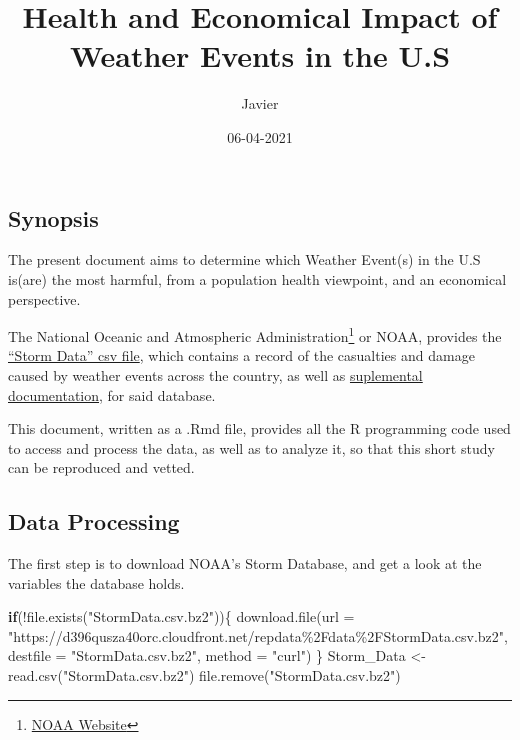 \documentclass[
]{article}
\title{Health and Economical Impact of Weather Events in the U.S}
\author{Javier}
\date{06-04-2021}
\newenvironment{Shaded}{\begin{snugshade}}{\end{snugshade}}
\newcommand{\AttributeTok}[1]{\textcolor[rgb]{0.77,0.63,0.00}{#1}}
\newcommand{\ControlFlowTok}[1]{\textcolor[rgb]{0.13,0.29,0.53}{\textbf{#1}}}
\newcommand{\FunctionTok}[1]{\textcolor[rgb]{0.00,0.00,0.00}{#1}}
\newcommand{\NormalTok}[1]{#1}
\newcommand{\OtherTok}[1]{\textcolor[rgb]{0.56,0.35,0.01}{#1}}
\newcommand{\SpecialCharTok}[1]{\textcolor[rgb]{0.00,0.00,0.00}{#1}}
\newcommand{\StringTok}[1]{\textcolor[rgb]{0.31,0.60,0.02}{#1}}
\begin{document}
\maketitle

\hypertarget{synopsis}{%
\subsection{Synopsis}\label{synopsis}}

The present document aims to determine which Weather Event(s) in the U.S
is(are) the most harmful, from a population health viewpoint, and an
economical perspective.

The National Oceanic and Atmospheric Administration\footnote{\href{https://www.noaa.gov/}{NOAA
  Website}} or NOAA, provides the
\href{https://d396qusza40orc.cloudfront.net/repdata\%2Fdata\%2FStormData.csv.bz2}{``Storm
Data'' csv file}, which contains a record of the casualties and damage
caused by weather events across the country, as well as
\href{https://d396qusza40orc.cloudfront.net/repdata\%2Fpeer2_doc\%2Fpd01016005curr.pdf}{suplemental
documentation}, for said database.

This document, written as a .Rmd file, provides all the R programming
code used to access and process the data, as well as to analyze it, so
that this short study can be reproduced and vetted.

\hypertarget{data-processing}{%
\subsection{Data Processing}\label{data-processing}}

The first step is to download NOAA's Storm Database, and get a look at
the variables the database holds.

\begin{Shaded}
\begin{Highlighting}[]
\ControlFlowTok{if}\NormalTok{(}\SpecialCharTok{!}\FunctionTok{file.exists}\NormalTok{(}\StringTok{"StormData.csv.bz2"}\NormalTok{))\{}
  \FunctionTok{download.file}\NormalTok{(}\AttributeTok{url =} \StringTok{"https://d396qusza40orc.cloudfront.net/repdata\%2Fdata\%2FStormData.csv.bz2"}\NormalTok{,}
              \AttributeTok{destfile =} \StringTok{"StormData.csv.bz2"}\NormalTok{,}
              \AttributeTok{method =} \StringTok{"curl"}\NormalTok{)}
\NormalTok{  \}}
\NormalTok{Storm\_Data }\OtherTok{\textless{}{-}} \FunctionTok{read.csv}\NormalTok{(}\StringTok{"StormData.csv.bz2"}\NormalTok{)}
\FunctionTok{file.remove}\NormalTok{(}\StringTok{"StormData.csv.bz2"}\NormalTok{)}
\end{Highlighting}
\end{Shaded}
\end{document}

